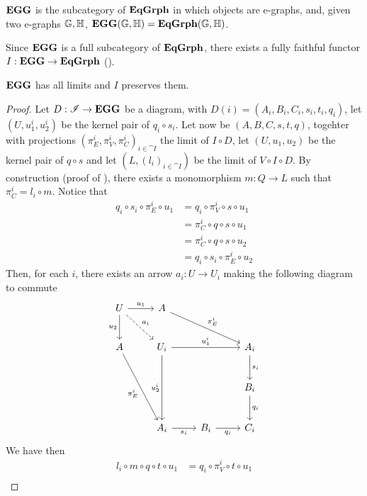 \begin{definition}\label{def:cat_of_eggs}
	$\mathbf{EGG}$ is the subcategory of $\mathbf{EqGrph}$ in which objects are e-graphs, and, given two e-graphs $\mathbb{G, H}$, $\mathbf{EGG}(\mathbb{G, H}) = \mathbf{EqGrph}(\mathbb{G, H})$.
\end{definition}

Since $\mathbf{EGG}$ is a full subcategory of $\mathbf{EqGrph}$, there exists a fully faithful functor $I: \mathbf{EGG} \to \mathbf{EqGrph}$ ().

\begin{lemma}
	$\mathbf{EGG}$ has all limits and $I$ preserves them.
\end{lemma}

\begin{proof}
	Let $D: \mathscr{I} \to \mathbf{EGG}$ be a diagram, with $D(i) = (A_i, B_i, C_i, s_i, t_i, q_i)$, let $(U, u_1^i, u_2^i)$ be the kernel pair of $q_i\circ s_i$. Let now be $(A, B, C, s, t, q)$, togehter with projections $(\pi_E^i, \pi_V^i, \pi_C^i)_{i \in \cat I}$ the limit of $I \circ D$, let $(U, u_1, u_2)$ be the kernel pair of $q\circ s$ and let $(L, (l_i)_{i \in \cat I})$ be the limit of $V\circ I\circ D$.
	By construction (proof of ), there exists a monomorphism $m: Q \to L$ such that $\pi_C^i = l_i \circ m$. Notice that
	\begin{align*}
		q_i\circ s_i\circ \pi^i_E\circ u_1 	&= q_i\circ \pi^i_V\circ s\circ u_1\\
							&= \pi_C^i\circ q\circ s\circ u_1\\
							&=\pi_C^i\circ q\circ s\circ u_2\\
							&= q_i \circ s_i \circ \pi_E^i \circ u_2
	\end{align*}
	Then, for each $i$, there exists an arrow $a_i:U\to U_i$ making the following diagram to commute
	\[
		\begin{tikzcd}[row sep = 25, column sep = 25]
			U \ar[r, "{u_1}"] \ar[d, "{u_2}"swap] \ar[dr, dashed, "{a_i}"] & A \ar[drr, "{\pi_E^i}"] && \\
			A \ar[ddr, "{\pi_E^i}"swap] & U_i \ar[rr, "{u_1^i}"] \ar[dd, "{u_2^i}"swap]&& A_i \ar[d, "{s_i}"] \\
			& & & B_i \ar[d, "{q_i}"]\\
			& A_i \ar[r, "{s_i}"swap] & B_i \ar[r, "{q_i}"swap] & C_i
		\end{tikzcd}
	\]
	We have then
	\begin{align*}
		l_i\circ m \circ q \circ t \circ u_1	&= q_i \circ \pi_V^i \circ t \circ u_1 \\

\end{align*}
\end{proof}
